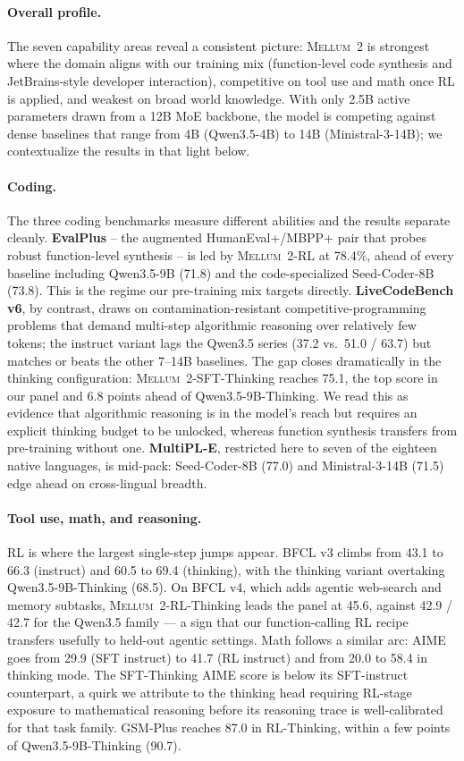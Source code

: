 \documentclass{llmxive}
\providecommand{\modelname}{\textsc{Mellum~2}\xspace}
\begin{document}
\paragraph{Overall profile.}
The seven capability areas reveal a consistent picture: \modelname is
strongest where the domain aligns with our training mix (function-level
code synthesis and JetBrains-style developer interaction),
competitive on tool use and math once RL is applied, and weakest on
broad world knowledge. With only 2.5B active parameters drawn from a
12B MoE backbone, the model is competing against dense baselines that
range from 4B (Qwen3.5-4B) to 14B (Ministral-3-14B); we contextualize
the results in that light below.

\paragraph{Coding.}
The three coding benchmarks measure different abilities and the
results separate cleanly. \textbf{EvalPlus} -- the augmented
HumanEval+/MBPP+ pair that probes robust function-level synthesis --
is led by \modelname-RL at 78.4\%, ahead of every baseline including
Qwen3.5-9B (71.8) and the code-specialized Seed-Coder-8B (73.8). This
is the regime our pre-training mix targets directly.
\textbf{LiveCodeBench v6}, by contrast, draws on
contamination-resistant competitive-programming problems that demand
multi-step algorithmic reasoning over relatively few tokens; the
instruct variant lags the Qwen3.5 series (37.2 vs.\ 51.0 / 63.7) but
matches or beats the other 7--14B baselines. The gap closes
dramatically in the thinking configuration: \modelname-SFT-Thinking
reaches 75.1, the top score in our panel and 6.8 points ahead of
Qwen3.5-9B-Thinking. We read this as evidence that algorithmic
reasoning is in the model's reach but requires an explicit thinking
budget to be unlocked, whereas function synthesis transfers from
pre-training without one. \textbf{MultiPL-E}, restricted here to seven
of the eighteen native languages, is mid-pack: Seed-Coder-8B (77.0)
and Ministral-3-14B (71.5) edge ahead on cross-lingual breadth.

\paragraph{Tool use, math, and reasoning.}
RL is where the largest single-step jumps appear. BFCL v3 climbs from
43.1 to 66.3 (instruct) and 60.5 to 69.4 (thinking), with the thinking
variant overtaking Qwen3.5-9B-Thinking (68.5). On BFCL v4, which adds
agentic web-search and memory subtasks, \modelname-RL-Thinking leads
the panel at 45.6, against 42.9 / 42.7 for the Qwen3.5 family --- a
sign that our function-calling RL recipe transfers usefully to
held-out agentic settings. Math follows a similar arc: AIME goes from
29.9 (SFT instruct) to 41.7 (RL instruct) and from 20.0 to 58.4 in
thinking mode. The SFT-Thinking AIME score is below its SFT-instruct
counterpart, a quirk we attribute to the thinking head requiring
RL-stage exposure to mathematical reasoning before its reasoning
trace is well-calibrated for that task family. GSM-Plus reaches 87.0
in RL-Thinking, within a few points of Qwen3.5-9B-Thinking (90.7).
\end{document}
